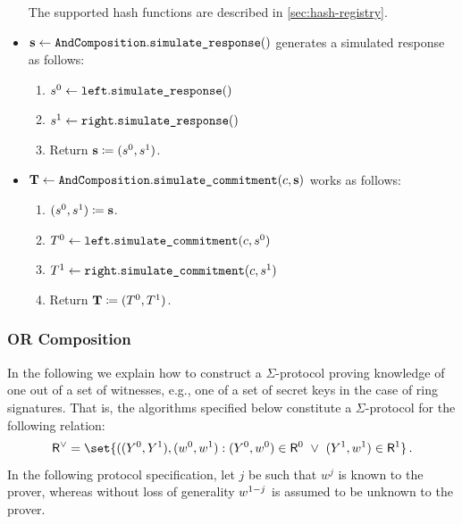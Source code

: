 \documentclass[11pt]{article}
\begin{document}
\begin{itemize}
\[   \]
   The supported hash functions are described in \cref{sec:hash-registry}.
  \item
  $\mathbf {s} \gets \texttt{AndComposition}.\texttt{simulate\_response}()$
   generates a simulated response as follows:
    \begin{enumerate}
      \item
        $s^0\gets\texttt{left}.\texttt{simulate\_response}()$
        \item $s^1\gets\texttt{right}.\texttt{simulate\_response}()$
      \item
        Return $\mathbf {s}\coloneqq(s^0,s^1)$.
    \end{enumerate}
  \item
  $\mathbf {T} \gets \texttt{AndComposition}.\texttt{simulate\_commitment}(c, \mathbf {s})$ works as follows:
    \begin{enumerate}
      \item
        $(s^0,s^1)\coloneqq\mathbf{s}$.
      \item
        $T^0\gets\texttt{left}.\texttt{simulate\_commitment}(c,s^0)$
        \item $T^1\gets\texttt{right}.\texttt{simulate\_commitment}(c,s^1)$
      \item
        Return $\mathbf {T}\coloneqq(T^0, T^1)$.
      \end{enumerate}
\end{itemize}



\subsubsection{OR Composition}
  In the following we explain how to construct a $\Sigma$-protocol proving knowledge of one out of a set of witnesses, e.g., one of a set of secret keys in the case of ring signatures.
  That is, the algorithms specified below constitute a $\Sigma$-protocol for the following relation:
\[
  \relation^\lor = \set{
    ((\statement^0,\statement^1),(\witness^0,\witness^1) :
    (\statement^0,\witness^0)\in \relation^0 ~\lor~ (\statement^1,\witness^1)\in\relation^1}\,.
\]
  In the following protocol specification, let $j$ be such that $w^j$ is known to the prover, whereas without loss of generality $w^{1-j}$ is assumed to be unknown to the prover.
\end{document}
